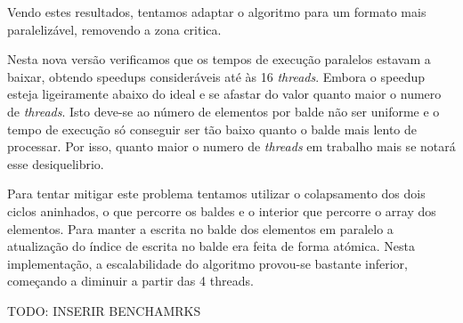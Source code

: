 \documentclass[a4paper]{report}
\begin{document}
Vendo estes resultados, tentamos adaptar o algoritmo para um formato mais
paralelizável, removendo a zona critica.

Nesta nova versão verificamos que os tempos de execução paralelos estavam a
baixar, obtendo speedups consideráveis até às 16 \textit{threads}. Embora o
speedup esteja ligeiramente abaixo do ideal e se afastar do valor quanto maior o
numero de \textit{threads}. Isto deve-se ao número de elementos por balde não
ser uniforme e o tempo de execução só conseguir ser tão baixo quanto o balde
mais lento de processar. Por isso, quanto maior o numero de \textit{threads} em
trabalho mais se notará esse desiquelibrio.

Para tentar mitigar este problema tentamos utilizar o colapsamento dos dois
ciclos aninhados, o que percorre os baldes e o interior que percorre o array dos
elementos. Para manter a escrita no balde dos elementos em paralelo a
atualização do índice de escrita no balde era feita de forma atómica. Nesta
implementação, a escalabilidade do algoritmo provou-se bastante inferior,
começando a diminuir a partir das 4 threads.

TODO: INSERIR BENCHAMRKS
\end{document}
